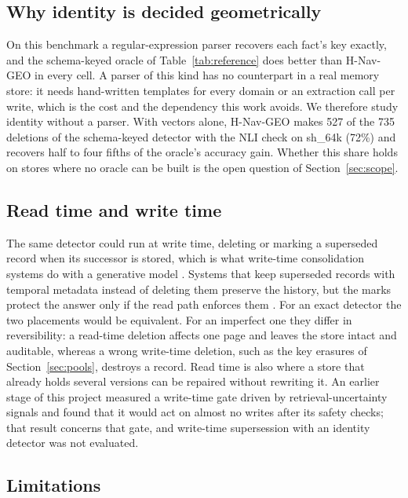\documentclass{CUP-JNL-NLP}
\newcommand{\sub}[1]{\textsf{sh\_#1}}                    %
\newcommand{\geo}{H-Nav-GEO}
\begin{document}
\subsection{Why identity is decided geometrically}
\label{sec:parser}

On this benchmark a regular-expression parser recovers each fact's key exactly, and the schema-keyed oracle of Table~\ref{tab:reference} does better than \geo{} in every cell. A parser of this kind has no counterpart in a real memory store: it needs hand-written templates for every domain or an extraction call per write, which is the cost and the dependency this work avoids. We therefore study identity without a parser. With vectors alone, \geo{} makes 527 of the 735 deletions of the schema-keyed detector with the NLI check on \sub{64k} (72\%) and recovers half to four fifths of the oracle's accuracy gain. Whether this share holds on stores where no oracle can be built is the open question of Section~\ref{sec:scope}.

\subsection{Read time and write time}
\label{sec:readwrite}

The same detector could run at write time, deleting or marking a superseded record when its successor is stored, which is what write-time consolidation systems do with a generative model \citep{chhikara2025mem0,yan2026memoryr1,wei2026fademem}. Systems that keep superseded records with temporal metadata instead of deleting them \citep{rasmussen2025zep,yadav2026temporal} preserve the history, but the marks protect the answer only if the read path enforces them \citep{shen2026revoked}. For an exact detector the two placements would be equivalent. For an imperfect one they differ in reversibility: a read-time deletion affects one page and leaves the store intact and auditable, whereas a wrong write-time deletion, such as the key erasures of Section~\ref{sec:pools}, destroys a record. Read time is also where a store that already holds several versions can be repaired without rewriting it. An earlier stage of this project measured a write-time gate driven by retrieval-uncertainty signals and found that it would act on almost no writes after its safety checks; that result concerns that gate, and write-time supersession with an identity detector was not evaluated.

\subsection{Limitations}
\label{sec:limitations}
\end{document}
